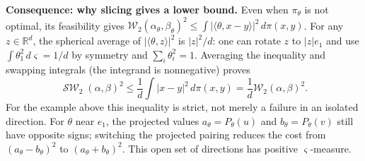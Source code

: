 \documentclass[11pt,a4paper]{article}
\theoremstyle{exostyle}
\newcommand{\R}{\mathbb{R}}
\newcommand{\Wtwo}{\mathcal{W}_2}
\newcommand{\ip}[2]{\langle #1,#2\rangle}
\DeclareMathOperator{\SW}{\mathcal{SW}}
\begin{document}
\begin{solution}
\textbf{Consequence: why slicing gives a lower bound.}
Even when $\pi_\theta$ is not optimal, its feasibility gives
$\Wtwo(\alpha_\theta,\beta_\theta)^2
\leq\int|\ip{\theta}{x-y}|^2\,d\pi(x,y)$.
For any $z\in\R^d$, the spherical average of
$|\ip{\theta}{z}|^2$ is $|z|^2/d$: one can rotate $z$ to $|z|e_1$
and use $\int\theta_1^2\,d\varsigma=1/d$ by symmetry and
$\sum_i\theta_i^2=1$. Averaging the inequality and swapping integrals
(the integrand is nonnegative) proves
\[
  \SW_2(\alpha,\beta)^2
     \leq \frac1d\int|x-y|^2\,d\pi(x,y)
     =\frac1d\Wtwo(\alpha,\beta)^2.
\]
For the example above this inequality is strict, not merely a failure
in an isolated direction. For $\theta$ near $e_1$, the projected
values $a_\theta=P_\theta(u)$ and $b_\theta=P_\theta(v)$ still have
opposite signs; switching the projected pairing reduces the cost
from $(a_\theta-b_\theta)^2$ to $(a_\theta+b_\theta)^2$.
This open set of directions has positive $\varsigma$-measure.
\end{solution}
\end{document}
